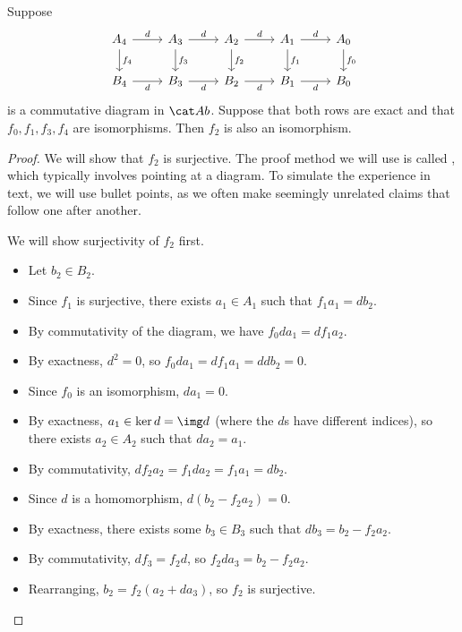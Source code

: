 \documentclass{standalone}
\begin{document}
\begin{theorem}
  Suppose
  \[
    \begin{tikzcd}
      A_4 \ar[r, "d"] \ar[d, "f_4"] &
        A_3 \ar[r, "d"] \ar[d, "f_3"] &
        A_2 \ar[r, "d"] \ar[d, "f_2"] &
        A_1 \ar[r, "d"] \ar[d, "f_1"] &
        A_0             \ar[d, "f_0"] \\
      B_4   \ar[r, "d", swap] &
        B_3 \ar[r, "d", swap] &
        B_2 \ar[r, "d", swap] &
        B_1 \ar[r, "d", swap] &
        B_0
    \end{tikzcd}
  \]
  is a commutative diagram in \(\cAb\). Suppose that both rows are exact
  and that \(f_0, f_1, f_3, f_4\) are isomorphisms.
  Then \(f_2\) is also an isomorphism.
\end{theorem}
\begin{proof}
  We will show that \(f_2\) is surjective. The proof method we will use
  is called , which typically involves pointing at
  a diagram. To simulate the experience in text, we will use bullet points,
  as we often make seemingly unrelated claims that follow one after another.

  We will show surjectivity of \(f_2\) first.
  \begin{itemize}[nosep]
    \item Let \(b_2 \in B_2\).
    \item Since \(f_1\) is surjective, there exists \(a_1 \in A_1\) such that
    \(f_1 a_1 = d b_2\).
    \item By commutativity of the diagram, we have \(f_0 d a_1 = d f_1 a_2\).
    \item By exactness, \(d^2 = 0\), so \(f_0 d a_1 = d f_1 a_1 = ddb_2 = 0\).
    \item Since \(f_0\) is an isomorphism, \(d a_1 = 0\).
    \item By exactness, \(a_1 \in \ker d = \img d\)
    (where the \(d\)s have different indices),
    so there exists \(a_2 \in A_2\) such that \(d a_2 = a_1\).
    \item By commutativity, \(d f_2 a_2 = f_1 d a_2 = f_1 a_1 = d b_2\).
    \item Since \(d\) is a homomorphism, \(d(b_2 - f_2 a_2) = 0\).
    \item By exactness, there exists some \(b_3 \in B_3\) such that
    \(d b_3 = b_2 - f_2 a_2\).
    \item By commutativity, \(d f_3 = f_2 d\), so
    \(f_2 d a_3 = b_2 - f_2 a_2\).
    \item Rearranging, \(b_2 = f_2(a_2 + da_3)\), so \(f_2\) is surjective.
  \end{itemize}


\end{proof}
\end{document}
